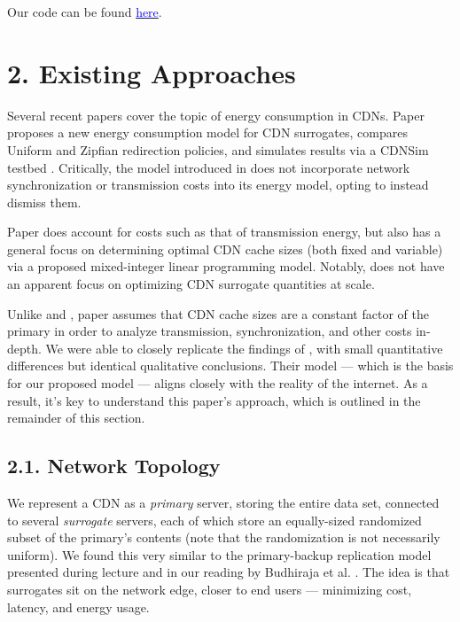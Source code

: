 \documentclass[
	a4paper, %
	10pt, %
	unnumberedsections, %
	twoside, %
]{LTJournalArticle}
\begin{document}
Our code can be found \href{https://github.com/andrewp2303/cdnconservation}{\textcolor{blue}{here}}.


\section{2. Existing Approaches}

Several recent papers cover the topic of energy consumption in CDNs. Paper \cite{ulIslam2012} proposes a new energy consumption model for CDN surrogates, compares Uniform and Zipfian redirection policies, and simulates results via a CDNSim testbed \cite{cdnsim}. Critically, the model introduced in \cite{ulIslam2012} does not incorporate network synchronization or transmission costs into its energy model, opting to instead dismiss them. 

Paper \cite{osmanthesis} does account for costs such as that of transmission energy, but also has a general focus on determining optimal CDN cache sizes (both fixed and variable) via a proposed mixed-integer linear programming model. Notably, \cite{osmanthesis} does not have an apparent focus on optimizing CDN surrogate quantities at scale.

Unlike \cite{osmanthesis} and \cite{ulIslam2012}, paper \cite{biancoCDNs2017} assumes that CDN cache sizes are a constant factor of the primary in order to analyze transmission, synchronization, and other costs in-depth. We were able to closely replicate the findings of \cite{biancoCDNs2017}, with small quantitative differences but identical qualitative conclusions. Their model — which is the basis for our proposed model — aligns closely with the reality of the internet. As a result, it's key to understand this paper's approach, which is outlined in the remainder of this section.

\subsection{2.1. Network Topology}

We represent a CDN as a \textit{primary} server, storing the entire data set, connected to several \textit{surrogate} servers, each of which store an equally-sized randomized subset of the primary's contents (note that the randomization is not necessarily uniform). We found this very similar to the primary-backup replication model presented during lecture and in our reading by Budhiraja et al. \cite{BudhirajaNavinPPLB}. The idea is that surrogates sit on the network edge, closer to end users — minimizing cost, latency, and energy usage. 
\end{document}

